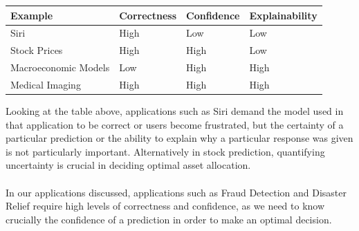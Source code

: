 \documentclass[12pt]{report}
\begin{document}
\begin{center}
\begin{tabular}{|l|l|l|l|}
\hline
\textbf{Example}     & \textbf{Correctness} & \textbf{Confidence} & \textbf{Explainability} \\ \hline
Siri                 & High                 & Low                 & Low                     \\ \hline
Stock Prices         & High                 & High                & Low                     \\ \hline
Macroeconomic Models & Low                  & High                & High                    \\ \hline
Medical Imaging      & High                 & High                & High                    \\ \hline
\end{tabular}
\end{center}

Looking at the table above, applications such as Siri demand the model used in that application to be correct or users become frustrated, but the certainty of a particular prediction or the ability to explain why a particular response was given is not particularly important.  Alternatively in stock prediction, quantifying uncertainty is crucial in deciding optimal asset allocation.  \\
\\
In our applications discussed, applications such as Fraud Detection and Disaster Relief require high levels of correctness and confidence, as we need to know crucially the confidence of a prediction in order to make an optimal decision.  \\
\end{document}
